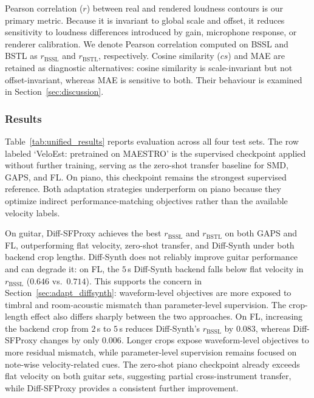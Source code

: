 \documentclass{article}
\begin{document}
Pearson correlation ($r$) between real and rendered loudness contours is our primary metric. Because it is invariant to global scale and offset, it reduces sensitivity to loudness differences introduced by gain, microphone response, or renderer calibration. We denote Pearson correlation computed on BSSL and BSTL as $r_{\mathrm{BSSL}}$ and $r_{\mathrm{BSTL}}$, respectively. Cosine similarity ($cs$) and MAE are retained as diagnostic alternatives: cosine similarity is scale-invariant but not offset-invariant, whereas MAE is sensitive to both. Their behaviour is examined in Section~\ref{sec:discussion}.

\subsubsection{Results}
Table~\ref{tab:unified_results} reports evaluation across all four test sets. The row labeled `VeloEst: pretrained on MAESTRO' is the supervised checkpoint applied without further training, serving as the zero-shot transfer baseline for SMD, GAPS, and FL. On piano, this checkpoint remains the strongest supervised reference. Both adaptation strategies underperform on piano because they optimize indirect performance-matching objectives rather than the available velocity labels.

On guitar, Diff-SFProxy achieves the best $r_{\mathrm{BSSL}}$ and $r_{\mathrm{BSTL}}$ on both GAPS and FL, outperforming flat velocity, zero-shot transfer, and Diff-Synth under both backend crop lengths. Diff-Synth does not reliably improve guitar performance and can degrade it: on FL, the $5$\,s Diff-Synth backend falls below flat velocity in $r_{\mathrm{BSSL}}$ ($0.646$ vs.\ $0.714$). This supports the concern in Section~\ref{sec:adapt_diffsynth}: waveform-level objectives are more exposed to timbral and room-acoustic mismatch than parameter-level supervision. The crop-length effect also differs sharply between the two approaches. On FL, increasing the backend crop from $2$\,s to $5$\,s reduces Diff-Synth's $r_{\mathrm{BSSL}}$ by $0.083$, whereas Diff-SFProxy changes by only $0.006$. Longer crops expose waveform-level objectives to more residual mismatch, while parameter-level supervision remains focused on note-wise velocity-related cues. The zero-shot piano checkpoint already exceeds flat velocity on both guitar sets, suggesting partial cross-instrument transfer, while Diff-SFProxy provides a consistent further improvement.
 
\end{document}
